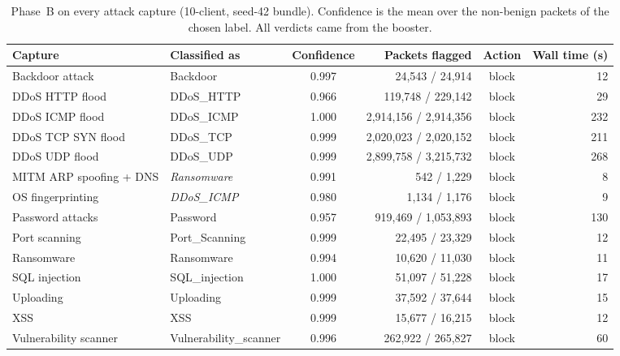 \begin{table}[t]
\centering
\caption{Phase~B on every attack capture (10-client, seed-42 bundle). Confidence is the mean over the non-benign packets of the chosen label. All verdicts came from the booster.}
\label{tab:phaseb}
\small
\begin{adjustbox}{max width=\linewidth}
\begin{tabular}{llcrcr}
\toprule
Capture & Classified as & Confidence & Packets flagged & Action & Wall time (s) \\
\midrule
Backdoor attack & Backdoor & 0.997 & 24,543 / 24,914 & block & 12 \\
DDoS HTTP flood & DDoS\_HTTP & 0.966 & 119,748 / 229,142 & block & 29 \\
DDoS ICMP flood & DDoS\_ICMP & 1.000 & 2,914,156 / 2,914,356 & block & 232 \\
DDoS TCP SYN flood & DDoS\_TCP & 0.999 & 2,020,023 / 2,020,152 & block & 211 \\
DDoS UDP flood & DDoS\_UDP & 0.999 & 2,899,758 / 3,215,732 & block & 268 \\
MITM ARP spoofing + DNS & \textit{Ransomware} & 0.991 & 542 / 1,229 & block & 8 \\
OS fingerprinting & \textit{DDoS\_ICMP} & 0.980 & 1,134 / 1,176 & block & 9 \\
Password attacks & Password & 0.957 & 919,469 / 1,053,893 & block & 130 \\
Port scanning & Port\_Scanning & 0.999 & 22,495 / 23,329 & block & 12 \\
Ransomware & Ransomware & 0.994 & 10,620 / 11,030 & block & 11 \\
SQL injection & SQL\_injection & 1.000 & 51,097 / 51,228 & block & 17 \\
Uploading & Uploading & 0.999 & 37,592 / 37,644 & block & 15 \\
XSS & XSS & 0.999 & 15,677 / 16,215 & block & 12 \\
Vulnerability scanner & Vulnerability\_scanner & 0.996 & 262,922 / 265,827 & block & 60 \\
\bottomrule
\end{tabular}
\end{adjustbox}
\end{table}

